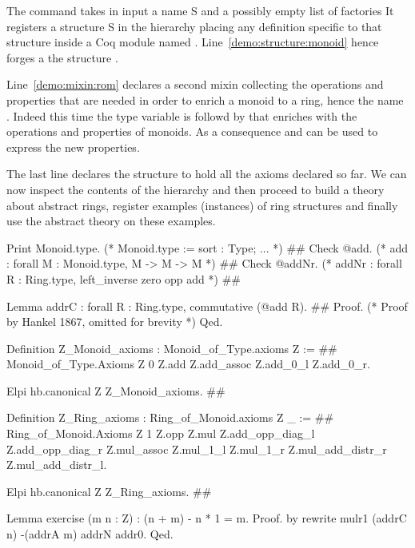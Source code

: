 \documentclass[a4paper,UKenglish,cleveref, autoref]{lipics-v2019}
\newcommand{\mixin}{mixin}
\newcommand{\factories}{factories}
\theoremstyle{implem}
\theoremstyle{implem}
\theoremstyle{axiom}
\theoremstyle{abscommand}
\theoremstyle{command}
\begin{document}
The  command takes in input a name S and a possibly
empty list of \factories{}
It registers a structure S in the hierarchy placing
any definition specific to that structure inside a Coq module named .
Line~\ref{demo:structure:monoid} hence forges a the structure .

Line~\ref{demo:mixin:rom} declares a second \mixin{} collecting the operations
and properties that are needed in order to enrich a monoid to a ring, hence
the name . Indeed this time the type variable 
is followd by  that enriches
 with the operations and properties of monoids. As a consequence
 and  can be used to express the new properties.

The last line declares the structure  to hold all the axioms declared
so far. We can now inspect the contents of the hierarchy and then
proceed to build a theory about abstract rings,
register examples (instances) of ring structures
and finally use the abstract theory on these examples.

\begin{coqcode}
Print Monoid.type. (* Monoid.type  :=  { sort : Type;  ... }                           *) #\label{demo:theory:print:type}#
Check @add.        (* add          :   forall M : Monoid.type, M -> M -> M             *) #\label{demo:theory:check:add}#
Check @addNr.      (* addNr        :   forall R : Ring.type, left_inverse zero opp add *) #\label{demo:theory:check:addNr}#

Lemma addrC : forall R : Ring.type, commutative (@add R).                       #\label{demo:theory:state:addrC}#
Proof. (* Proof by Hankel 1867, omitted for brevity *) Qed.

Definition Z_Monoid_axioms : Monoid_of_Type.axioms Z :=                         #\label{demo:theory:z:monoid:axioms}#
  Monoid_of_Type.Axioms Z 0 Z.add
    Z.add_assoc Z.add_0_l Z.add_0_r.

Elpi hb.canonical Z Z_Monoid_axioms.                                            #\label{demo:theory:z:monoid:canonical}#

Definition Z_Ring_axioms : Ring_of_Monoid.axioms Z _ :=                        #\label{demo:theory:z:ring:axioms}#
  Ring_of_Monoid.Axioms Z 1 Z.opp Z.mul
    Z.add_opp_diag_l Z.add_opp_diag_r Z.mul_assoc Z.mul_1_l Z.mul_1_r
    Z.mul_add_distr_r Z.mul_add_distr_l.

Elpi hb.canonical Z Z_Ring_axioms.                                              #\label{demo:theory:z:ring:canonical}#

Lemma exercise (m n : Z) : (n + m) - n * 1 = m.
Proof. by rewrite mulr1 (addrC n) -(addrA m) addrN addr0. Qed.
\end{coqcode}
\end{document}

